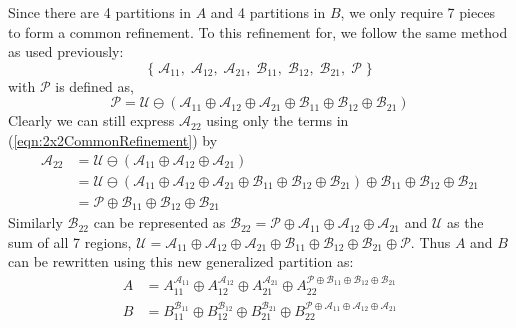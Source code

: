 Since there are 4 partitions in $A$ and 4 partitions in $B$, we only require 7 pieces to form a common refinement.
To this refinement for, we follow the same method as used previously:
\begin{equation}
	\label{eqn:2x2CommonRefinement}
	\Big\{ \;
		\mathcal{A}_{11}, \; \mathcal{A}_{12}, \;  \mathcal{A}_{21}, \;
		\mathcal{B}_{11}, \; \mathcal{B}_{12}, \; \mathcal{B}_{21}, \; \mathcal{P} 
	\; \Big\}
\end{equation}
with $\mathcal{P}$ is defined as,
\begin{equation}
	\mathcal{P} = \mathcal{U} 
		\ominus \left( \mathcal{A}_{11} \oplus \mathcal{A}_{12} \oplus \mathcal{A}_{21} \oplus
				\mathcal{B}_{11} \oplus \mathcal{B}_{12} \oplus \mathcal{B}_{21} \right)
\end{equation}
Clearly we can still express $\mathcal{A}_{22}$ using only the terms in (\ref{eqn:2x2CommonRefinement}) by
\begin{align*}
	\mathcal{A}_{22} 
		&= \mathcal{U} \ominus (\mathcal{A}_{11} \oplus \mathcal{A}_{12} \oplus \mathcal{A}_{21}) \\[-0.5em]
		& = \mathcal{U} \ominus (\mathcal{A}_{11} \oplus \mathcal{A}_{12} \oplus \mathcal{A}_{21} 
			\oplus \mathcal{B}_{11} \oplus \mathcal{B}_{12} \oplus \mathcal{B}_{21}) 
			\oplus \mathcal{B}_{11} \oplus \mathcal{B}_{12} \oplus \mathcal{B}_{21}\\[-0.5em]
		&= \mathcal{P} \oplus \mathcal{B}_{11} \oplus \mathcal{B}_{12} \oplus \mathcal{B}_{21}
\end{align*}
Similarly $\mathcal{B}_{22}$ can be represented as $\mathcal{B}_{22} = \mathcal{P} \oplus \mathcal{A}_{11} \oplus \mathcal{A}_{12} \oplus \mathcal{A}_{21}$
and $\mathcal{U}$ as the sum of all 7 regions, 
$\mathcal{U} = 	\mathcal{A}_{11} \oplus \mathcal{A}_{12} \oplus \mathcal{A}_{21} \oplus 
				\mathcal{B}_{11} \oplus \mathcal{B}_{12} \oplus \mathcal{B}_{21} \oplus \mathcal{P}$.
Thus $A$ and $B$ can be rewritten using this new generalized partition as:
\begin{align*}
	A &= A_{11}^{\mathcal{A}_{11}} \oplus 
		A_{12}^{\mathcal{A}_{12}} \oplus 
		A_{21}^{\mathcal{A}_{21}} \oplus 
		A_{22}^{\mathcal{P} \oplus \mathcal{B}_{11} \oplus \mathcal{B}_{12} \oplus \mathcal{B}_{21}} \\
	B &= B_{11}^{\mathcal{B}_{11}} \oplus 
		B_{12}^{\mathcal{B}_{12}} \oplus 
		B_{21}^{\mathcal{B}_{21}} \oplus 
		B_{22}^{\mathcal{P} \oplus \mathcal{A}_{11} \oplus \mathcal{A}_{12} \oplus \mathcal{A}_{21}} 
\end{align*}


